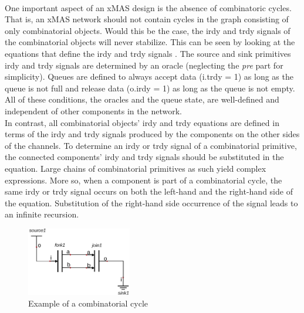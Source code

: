\documentclass[a4paper,11pt]{article}
\begin{document}
\paragraph{}
One important aspect of an xMAS design is the absence of combinatoric cycles. That is, an xMAS
network should not contain cycles in the graph consisting of only combinatorial objects.
Would this be the case, the irdy and trdy signals of the combinatorial objects will never
stabilize. This can be seen by looking at the equations that define the irdy and trdy signals
\cite{chatterjee10}. The source and sink primitives irdy and trdy signals are determined by an
oracle (neglecting the \emph{pre} part for simplicity). Queues are defined to always accept
data (i.trdy = 1) as long as the queue is not full and release data (o.irdy = 1) as long as
the queue is not empty. All of these conditions, the oracles and the queue state, are well-defined
and independent of other components in the network.\\
In contrast, all combinatorial objects' irdy and trdy equations are defined in terms of the
irdy and trdy signals produced by the components on the other sides of the channels.
To determine an irdy or trdy signal of a combinatorial primitive, the connected components'
irdy and trdy signals should be substituted in the equation. Large chains of combinatorial
primitives as such yield complex expressions. More so, when a component is part of a
combinatorial cycle, the same irdy or trdy signal occurs on both the left-hand and the
right-hand side of the equation. Substitution of the right-hand side occurrence of the signal leads
to an infinite recursion.

\begin{figure}[hp]
 \includegraphics[height=3cm]{images/fork-join-cycle}
 \caption{Example of a combinatorial cycle}
 \label{fig:fork-join-cycle}
\end{figure}
\end{document}
